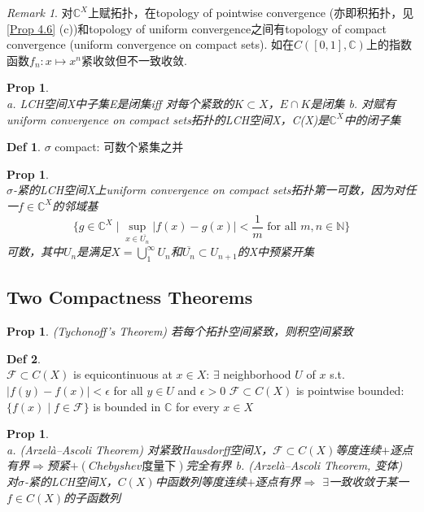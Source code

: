 \documentclass[hidelinks]{article}
\theoremstyle{definition}
\newtheorem*{defin}{Def}
\theoremstyle{plain}
\newtheorem{proposition}[theorem]{Prop}
\theoremstyle{remark}
\newtheorem*{remark}{Remark}
\begin{document}
\begin{remark}
对$\mathbb{C}^X$上赋拓扑，在topology of pointwise convergence (亦即积拓扑，见\autoref{Prop 4.6} (c))和topology of uniform convergence之间有topology of compact convergence (uniform convergence on compact sets). 如在$C([0,1],\mathbb{C})$上的指数函数$f_n:x\mapsto x^n$紧收敛但不一致收敛.
\end{remark}

\begin{proposition}~\\
a. LCH空间X中子集E是闭集iff 对每个紧致的$K\subset X$，$E\cap K$是闭集 \newline
b. 对赋有uniform convergence on compact sets拓扑的LCH空间X，C(X)是$\mathbb{C}^X$中的闭子集
\end{proposition}


\begin{defin}
$\sigma$ compact: 可数个紧集之并
\end{defin}

\begin{proposition}~\\
$\sigma$-紧的LCH空间X上uniform convergence on compact sets拓扑第一可数，因为对任一$f\in \mathbb{C}^X$的邻域基
\[
\bigg\{g\in \mathbb{C}^X\mid \sup_{x\in \overline{U_n}}|f(x)-g(x)|<\frac{1}{m}\textrm{ for all }m,n\in \mathbb{N} \bigg\} 
\]
可数，其中$U_n$是满足$X=\bigcup_{1}^{\infty}U_n$和$\overline{U_n}\subset U_{n+1}$的X中预紧开集
\end{proposition}



\subsection{Two Compactness Theorems}
\begin{proposition}(Tychonoff's Theorem)
若每个拓扑空间紧致，则积空间紧致
\end{proposition}

\begin{defin}~\\
$\mathscr{F}\subset C(X)$ is equicontinuous at $x\in X$: $\exists$ neighborhood $U$ of $x$ s.t. $|f(y)-f(x)|<\epsilon$ for all $y\in U$ and $\epsilon>0$ \newline
$\mathscr{F}\subset C(X)$ is pointwise bounded: $\{f(x)\mid f\in \mathscr{F}\}$ is bounded in $\mathbb{C}$ for every $x\in X$
\end{defin}

\begin{proposition}~\\
a. (Arzelà–Ascoli Theorem) 对紧致Hausdorff空间X，$\mathscr{F}\subset C(X)$等度连续$+$逐点有界$\Rightarrow$预紧$+$$(Chebyshev\textrm{度量下})$完全有界 \newline
b. (Arzelà–Ascoli Theorem, 变体) 对$\sigma$-紧的LCH空间X，$C(X)$中函数列等度连续$+$逐点有界$\Rightarrow$ $\exists$一致收敛于某一$f\in C(X)$的子函数列
\end{proposition}
\end{document}
